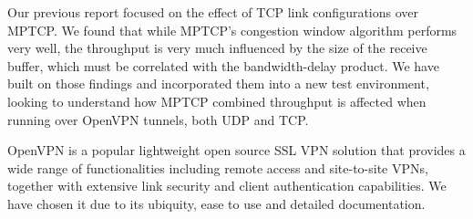 Our previous report \cite{sem1} focused on the effect of TCP link configurations over MPTCP. We found that while MPTCP's congestion window algorithm performs very well, the throughput is very much influenced by the size of the receive buffer, which must be correlated with the bandwidth-delay product. We have built on those findings and incorporated them into a new test environment, looking to understand how MPTCP combined throughput is affected when running over OpenVPN tunnels, both UDP and TCP.

OpenVPN is a popular lightweight open source SSL VPN solution that provides a wide range of functionalities including remote access and site-to-site VPNs, together with extensive link security and client authentication capabilities. We have chosen it due to its ubiquity, ease to use and detailed documentation.